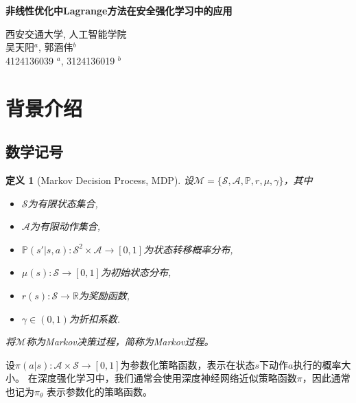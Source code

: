 \documentclass[12pt, a4paper, oneside]{ctexart}
\newtheorem{definition}{定义}
\numberwithin{equation}{section}  %
\newenvironment{myTitle}[1]{
    \begin{center}
    {\zihao{-2}\bf #1\\[1ex]}
    \zihao{-4}\it
}{\end{center}}  %
\def\R{\mathbb{R}}          %
\def\P{\mathbb{P}}          %
\def\S{\mathcal{S}}
\def\A{\mathcal{A}}
\def\M{\mathcal{M}}
\begin{document}

\clearpage
\begin{myTitle}{非线性优化中Lagrange方法在安全强化学习中的应用}
西安交通大学, 人工智能学院\\
吴天阳$^a$, 郭涵伟$^b$\\
4124136039 $^a$, 3124136019 $^b$\\
\end{myTitle}
\section{背景介绍}
\subsection{数学记号}
\begin{definition}[Markov Decision Process, MDP]
    设$\M=\{\S,\A,\P,r,\mu,\gamma\}$，其中
    \begin{itemize}
        \item $\S$为有限状态集合,
        \item $\A$为有限动作集合,
        \item $\P(s'|s,a):\S^2\times\A\to[0,1]$为状态转移概率分布,
        \item $\mu(s):\S\to[0,1]$为初始状态分布,
        \item $r(s):\S\to\R$为奖励函数,
        \item $\gamma\in(0,1)$为折扣系数.
    \end{itemize}
    将$\M$称为Markov决策过程，简称为Markov过程。
\end{definition}
设$\pi(a|s):\A\times \S\to[0,1]$为参数化策略函数，表示在状态$s$下动作$a$执行的概率大小。
在深度强化学习中，我们通常会使用深度神经网络近似策略函数$\pi$，因此通常也记为$\pi_\theta$
表示参数化的策略函数。
\end{document}
